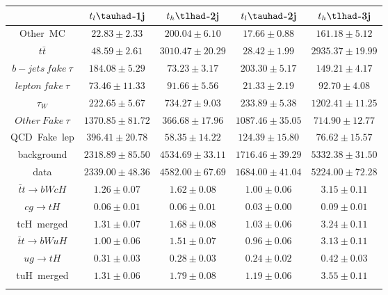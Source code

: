 \centering
\begin{tabular}{ccccc} \toprule\toprule
 & $t_{l}\tauhad$-1j & $t_{h}\tlhad$-2j & $t_{l}\tauhad$-2j & $t_{h}\tlhad$-3j\\\midrule
Other~MC & $22.83\pm2.33$ & $200.04\pm6.10$ & $17.66\pm0.88$ & $161.18\pm5.12$\\
$t\bar{t}$ & $48.59\pm2.61$ & $3010.47\pm20.29$ & $28.42\pm1.99$ & $2935.37\pm19.99$\\
$b-jets~fake~\tau$ & $184.08\pm5.29$ & $73.23\pm3.17$ & $203.30\pm5.17$ & $149.21\pm4.17$\\
$lepton~fake~\tau$ & $73.46\pm11.33$ & $91.66\pm5.56$ & $21.33\pm2.19$ & $92.70\pm4.08$\\
$\tau_{W}$ & $222.65\pm5.67$ & $734.27\pm9.03$ & $233.89\pm5.38$ & $1202.41\pm11.25$\\
$Other~Fake~\tau$ & $1370.85\pm81.72$ & $366.68\pm17.96$ & $1087.46\pm35.05$ & $714.90\pm12.77$\\
QCD~Fake~lep & $396.41\pm20.78$ & $58.35\pm14.22$ & $124.39\pm15.80$ & $76.62\pm15.57$\\
background & $2318.89\pm85.50$ & $4534.69\pm33.11$ & $1716.46\pm39.29$ & $5332.38\pm31.50$\\
data & $2339.00\pm48.36$ & $4582.00\pm67.69$ & $1684.00\pm41.04$ & $5224.00\pm72.28$\\
$\bar{t}t\to bWcH$ & $1.26\pm0.07$ & $1.62\pm0.08$ & $1.00\pm0.06$ & $3.15\pm0.11$\\
$cg\to tH$ & $0.06\pm0.01$ & $0.06\pm0.01$ & $0.03\pm0.00$ & $0.09\pm0.01$\\
tcH~merged & $1.31\pm0.07$ & $1.68\pm0.08$ & $1.03\pm0.06$ & $3.24\pm0.11$\\
$\bar{t}t\to bWuH$ & $1.00\pm0.06$ & $1.51\pm0.07$ & $0.96\pm0.06$ & $3.13\pm0.11$\\
$ug\to tH$ & $0.31\pm0.03$ & $0.28\pm0.03$ & $0.24\pm0.02$ & $0.42\pm0.03$\\
tuH~merged & $1.31\pm0.06$ & $1.79\pm0.08$ & $1.19\pm0.06$ & $3.55\pm0.11$\\
\bottomrule\bottomrule\\
\end{tabular}
